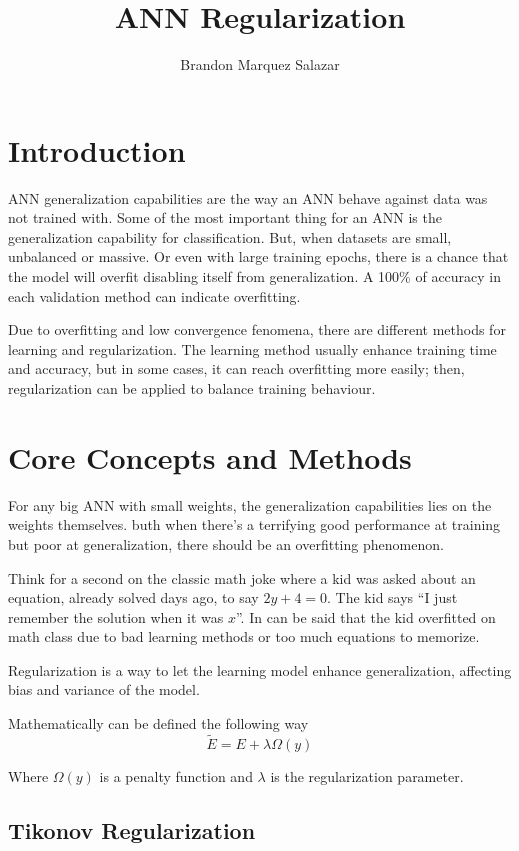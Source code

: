 \documentclass[
]{IEEEtran}
\title{ANN Regularization}
\author{Brandon Marquez Salazar}
\date{}
\begin{document}
\maketitle


\section{Introduction}\label{introduction}

ANN generalization capabilities are the way an ANN behave against data
was not trained with. Some of the most important thing for an ANN is the
generalization capability for classification. But, when datasets are
small, unbalanced or massive. Or even with large training epochs, there
is a chance that the model will overfit disabling itself from
generalization. A 100\% of accuracy in each validation method can
indicate overfitting.

Due to overfitting and low convergence fenomena, there are different
methods for learning and regularization. The learning method usually
enhance training time and accuracy, but in some cases, it can reach
overfitting more easily; then, regularization can be applied to balance
training behaviour.

\section{Core Concepts and Methods}\label{core-concepts-and-methods}

For any big ANN with small weights, the generalization capabilities lies
on the weights themselves. buth when there's a terrifying good
performance at training but poor at generalization, there should be an
overfitting phenomenon.

Think for a second on the classic math joke where a kid was asked about
an equation, already solved days ago, to say \(2y + 4 = 0\). The kid
says ``I just remember the solution when it was \(x\)''. In can be said
that the kid overfitted on math class due to bad learning methods or too
much equations to memorize.

Regularization is a way to let the learning model enhance
generalization, affecting bias and variance of the model.

Mathematically can be defined the following way
\[\tilde{E} = E + \lambda\Omega (y)\]

Where \(\Omega(y)\) is a penalty function and \(\lambda\) is the
regularization parameter.

\subsection{Tikonov Regularization}\label{tikonov-regularization}
\end{document}
